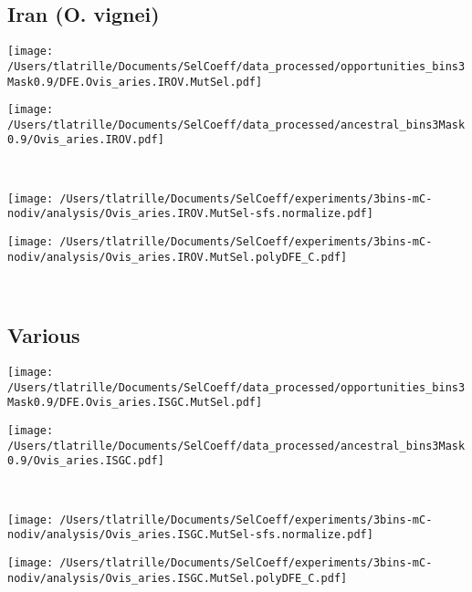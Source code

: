 \documentclass{article}
\begin{document}
    \subsection{Iran (O. vignei)}

    \begin{minipage}{0.49\linewidth}
        \texttt{[image: /Users/tlatrille/Documents/SelCoeff/data\_processed/opportunities\_bins3Mask0.9/DFE.Ovis\_aries.IROV.MutSel.pdf]}
    \end{minipage}
    \begin{minipage}{0.49\linewidth}
        \texttt{[image: /Users/tlatrille/Documents/SelCoeff/data\_processed/ancestral\_bins3Mask0.9/Ovis\_aries.IROV.pdf]}
    \end{minipage}
    \\
    \begin{minipage}{0.49\linewidth}
        \texttt{[image: /Users/tlatrille/Documents/SelCoeff/experiments/3bins-mC-nodiv/analysis/Ovis\_aries.IROV.MutSel-sfs.normalize.pdf]}
    \end{minipage}
    \begin{minipage}{0.49\linewidth}
        \texttt{[image: /Users/tlatrille/Documents/SelCoeff/experiments/3bins-mC-nodiv/analysis/Ovis\_aries.IROV.MutSel.polyDFE\_C.pdf]}
    \end{minipage}
    \\
    \subsection{Various}

    \begin{minipage}{0.49\linewidth}
        \texttt{[image: /Users/tlatrille/Documents/SelCoeff/data\_processed/opportunities\_bins3Mask0.9/DFE.Ovis\_aries.ISGC.MutSel.pdf]}
    \end{minipage}
    \begin{minipage}{0.49\linewidth}
        \texttt{[image: /Users/tlatrille/Documents/SelCoeff/data\_processed/ancestral\_bins3Mask0.9/Ovis\_aries.ISGC.pdf]}
    \end{minipage}
    \\
    \begin{minipage}{0.49\linewidth}
        \texttt{[image: /Users/tlatrille/Documents/SelCoeff/experiments/3bins-mC-nodiv/analysis/Ovis\_aries.ISGC.MutSel-sfs.normalize.pdf]}
    \end{minipage}
    \begin{minipage}{0.49\linewidth}
        \texttt{[image: /Users/tlatrille/Documents/SelCoeff/experiments/3bins-mC-nodiv/analysis/Ovis\_aries.ISGC.MutSel.polyDFE\_C.pdf]}
    \end{minipage}
    \\
\end{document}
